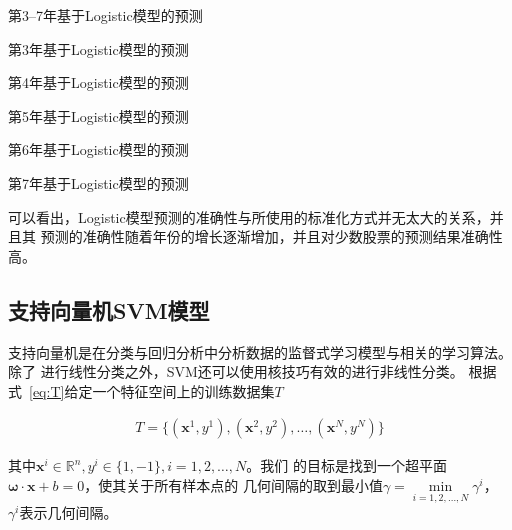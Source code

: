 \documentclass[../main]{subfiles}
\begin{document}
\begin{table}[htpb]
  \centering
  \caption{第3--7年基于Logistic模型的预测}%
  \label{tab:logistic}
  \setlength\tabcolsep{2pt}
  \begin{subtable}[htbp]{0.45\linewidth}
    \centering
    \caption{第3年基于Logistic模型的预测}%
    \label{tab:logistic3}
  \end{subtable}
  \qquad
  \begin{subtable}[htbp]{0.45\linewidth}
    \centering
    \caption{第4年基于Logistic模型的预测}%
    \label{tab:logistic4}
  \end{subtable}

  \begin{subtable}[htbp]{0.45\linewidth}
    \centering
    \caption{第5年基于Logistic模型的预测}%
    \label{tab:logistic5}
  \end{subtable}
  \qquad
  \begin{subtable}[htbp]{0.45\linewidth}
    \centering
    \caption{第6年基于Logistic模型的预测}%
    \label{tab:logistic6}
  \end{subtable}

  \begin{subtable}[htbp]{0.45\linewidth}
    \centering
    \caption{第7年基于Logistic模型的预测}%
    \label{tab:logistic7}
  \end{subtable}
\end{table}

可以看出，Logistic模型预测的准确性与所使用的标准化方式并无太大的关系，并且其
预测的准确性随着年份的增长逐渐增加，并且对少数股票的预测结果准确性高。

\subsection{支持向量机SVM模型}%
\label{sub:svm}

支持向量机是在分类与回归分析中分析数据的监督式学习模型与相关的学习算法。除了
进行线性分类之外，SVM还可以使用核技巧有效的进行非线性分类。
根据式~\ref{eq:T}给定一个特征空间上的训练数据集$T$

\begin{align}
  \label{eq:T}
  T = \{(\bm{x}^1, y^1), (\bm{x}^2, y^2), \ldots, (\bm{x}^N, y^N)\}
\end{align}

其中$\bm{x}^i \in \mathbb{R}^n, y^i \in \{1, -1\}, i = 1, 2, \ldots, N$。我们
的目标是找到一个超平面$\bm{\omega}\cdot\bm{x} + b = 0$，使其关于所有样本点的
几何间隔的取到最小值$\gamma = \min\limits_{i = 1, 2, \ldots, N}\gamma^i$，
$\gamma^i$表示几何间隔。
\end{document}
